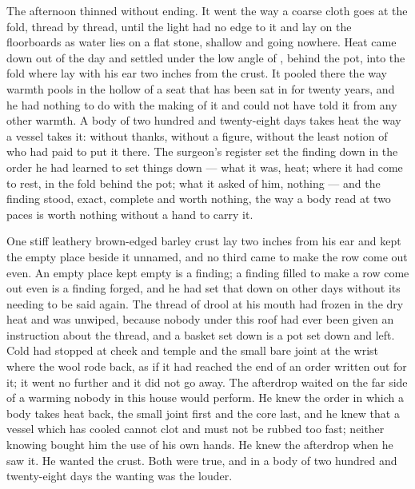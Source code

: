 The afternoon thinned without ending. It went the way a coarse cloth goes at the fold, thread by thread, until the light had no edge to it and lay on the floorboards as water lies on a flat stone, shallow and going nowhere. Heat came down out of the day and settled under the low angle of , behind the pot, into the fold where  lay with his ear two inches from the crust. It pooled there the way warmth pools in the hollow of a seat that has been sat in for twenty years, and he had nothing to do with the making of it and could not have told it from any other warmth. A body of two hundred and twenty-eight days takes heat the way a vessel takes it: without thanks, without a figure, without the least notion of who had paid to put it there. The surgeon's register set the finding down in the order he had learned to set things down --- what it was, heat; where it had come to rest, in the fold behind the pot; what it asked of him, nothing --- and the finding stood, exact, complete and worth nothing, the way a body read at two paces is worth nothing without a hand to carry it.

One stiff leathery brown-edged barley crust lay two inches from his ear and kept the empty place beside it unnamed, and no third came to make the row come out even. An empty place kept empty is a finding; a finding filled to make a row come out even is a finding forged, and he had set that down on other days without its needing to be said again. The thread of drool at his mouth had frozen in the dry heat and was unwiped, because nobody under this roof had ever been given an instruction about the thread, and a basket set down is a pot set down and left. Cold had stopped at cheek and temple and the small bare joint at the wrist where the wool rode back, as if it had reached the end of an order written out for it; it went no further and it did not go away. The afterdrop waited on the far side of a warming nobody in this house would perform. He knew the order in which a body takes heat back, the small joint first and the core last, and he knew that a vessel which has cooled cannot clot and must not be rubbed too fast; neither knowing bought him the use of his own hands. He knew the afterdrop when he saw it. He wanted the crust. Both were true, and in a body of two hundred and twenty-eight days the wanting was the louder.


